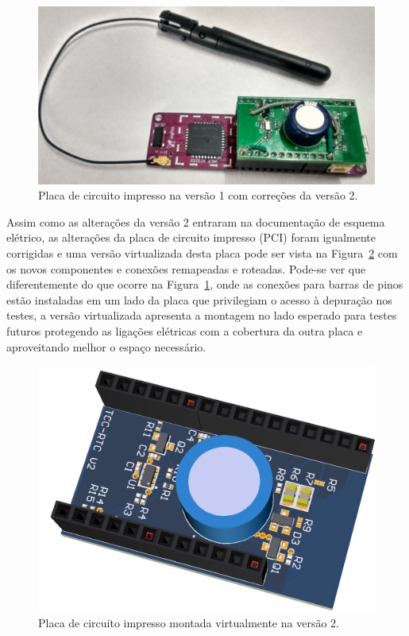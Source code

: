 \begin{figure}[h!]
  \caption{Placa de circuito impresso na versão 1 com correções da versão 2.}
  \begin{center}
      \includegraphics[scale=0.1]{img/fotoplaca.png}
  \end{center}
  \label{fig:fotoplaca}
\end{figure}

Assim como as alterações da versão 2 entraram na documentação de esquema elétrico, as alterações da placa de circuito impresso (PCI) foram igualmente corrigidas e uma versão virtualizada desta placa pode ser vista na Figura~\ref{fig:pcbV2} com os novos componentes e conexões remapeadas e roteadas. Pode-se ver que diferentemente do que ocorre na Figura~\ref{fig:fotoplaca}, onde as conexões para barras de pinos estão instaladas em um lado da placa que privilegiam o acesso à depuração nos testes, a versão virtualizada apresenta a montagem no lado esperado para testes futuros protegendo as ligações elétricas com a cobertura da outra placa e aproveitando melhor o espaço necessário.

\begin{figure}[h!]
  \caption{Placa de circuito impresso montada virtualmente na versão 2.}
  \begin{center}
      \includegraphics[scale=0.5]{img/PCB_TCC.png}
  \end{center}
  \label{fig:pcbV2}
\end{figure}




